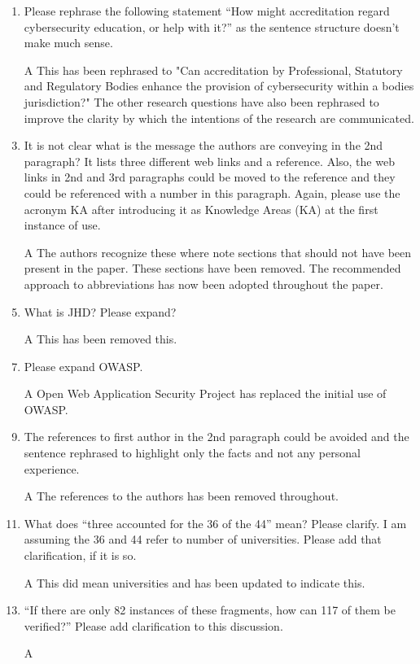 \documentclass{article}
\begin{document}
\begin{enumerate}
\item Please rephrase the following statement ``How might accreditation regard cybersecurity education, or help with it?'' as the sentence structure doesn't make much sense. 
\item[A] This has been rephrased to "Can accreditation by Professional, Statutory and Regulatory Bodies enhance the provision of cybersecurity within a bodies jurisdiction?" The other research questions have also been rephrased to improve the clarity by which the intentions of the research are communicated.
\item It is not clear what is the message the authors are conveying in the 2nd paragraph? It lists three different web links and a reference. Also, the web links in 2nd and 3rd paragraphs could be moved to the reference and they could be referenced with a number in this paragraph. 
Again, please use the acronym KA after introducing it as Knowledge Areas (KA) at the first instance of use. 


\item[A] The authors recognize these where note sections that should not have been present in the paper. These sections have been removed. The recommended approach to abbreviations has now been adopted throughout the paper.
\item  What is JHD? Please expand?
\item[A] This has been removed this. 
\item Please expand OWASP. 
\item[A]Open Web Application Security Project has replaced the initial use of OWASP.
\item 
The references to first author in the 2nd paragraph could be avoided and the sentence rephrased to highlight only the facts and not any personal experience. 
\item[A] The references to the authors has been removed throughout.
\item 
 What does ``three accounted for the 36 of the 44'' mean? Please clarify. I am assuming the 36 and 44 refer to number of universities. Please add that clarification, if it is so.
\item[A] This did mean universities and has been updated to indicate this.
\item 
``If there are only 82 instances of these fragments, how can 117 of them be verified?'' Please add clarification to this discussion.
\item[A]
\end{enumerate}
\end{document}
